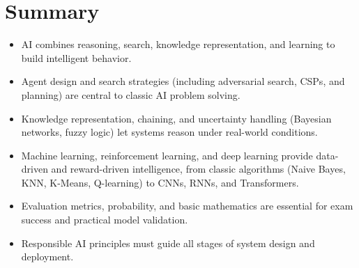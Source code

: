 \documentclass[11pt,a4paper]{article}
\begin{document}
\section{Summary}

\begin{examplebox}
\begin{itemize}[leftmargin=*]
  \item AI combines reasoning, search, knowledge representation, and learning to build intelligent behavior.
  \item Agent design and search strategies (including adversarial search, CSPs, and planning) are central to classic AI problem solving.
  \item Knowledge representation, chaining, and uncertainty handling (Bayesian networks, fuzzy logic) let systems reason under real-world conditions.
  \item Machine learning, reinforcement learning, and deep learning provide data-driven and reward-driven intelligence, from classic algorithms (Naive Bayes, KNN, K-Means, Q-learning) to CNNs, RNNs, and Transformers.
  \item Evaluation metrics, probability, and basic mathematics are essential for exam success and practical model validation.
  \item Responsible AI principles must guide all stages of system design and deployment.
\end{itemize}
\end{examplebox}
\end{document}
